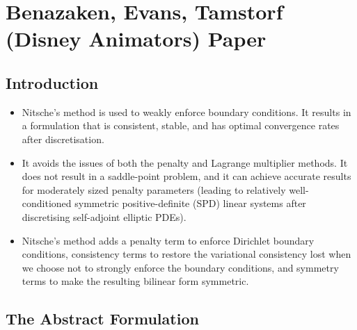 \documentclass[11pt,a4paper]{article}
\begin{document}
\newpage

\section{Benazaken, Evans, Tamstorf (Disney Animators) Paper \cite{BenzakenEvansTamstorf2024}}

\subsection{Introduction}

\begin{itemize}
    \item Nitsche's method is used to weakly enforce boundary conditions. It results in a formulation that is consistent, stable, and has optimal convergence rates after discretisation.

    \item It avoids the issues of both the penalty and Lagrange multiplier methods. It does not result in a saddle-point problem, and it can achieve accurate results for moderately sized penalty parameters (leading to relatively well-conditioned symmetric positive-definite (SPD) linear systems after discretising self-adjoint elliptic PDEs).

    \item Nitsche's method adds a penalty term to enforce Dirichlet boundary conditions, consistency terms to restore the variational consistency lost when we choose not to strongly enforce the boundary conditions, and symmetry terms to make the resulting bilinear form symmetric.
\end{itemize}

\subsection{The Abstract Formulation}
\end{document}
